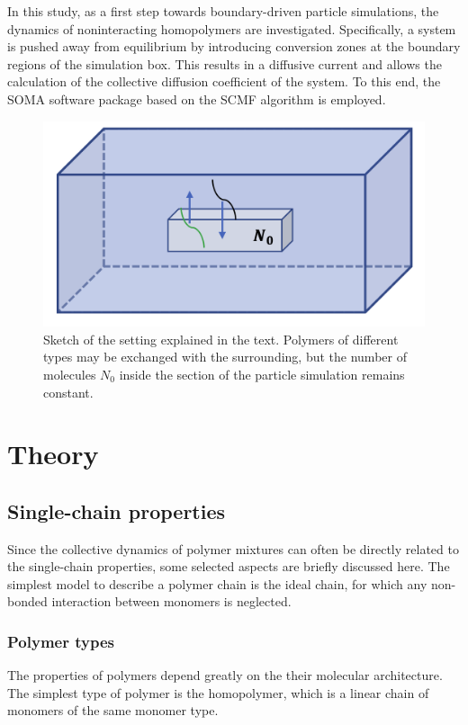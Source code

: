 \documentclass[bachelor,       %
               twoside,        %
               BCOR10mm,       %
               ngerman, english %
               ]{GAUBM}
\begin{document}
In this study, as a first step towards boundary-driven particle simulations, the dynamics of noninteracting homopolymers are investigated. Specifically, a system is pushed away from equilibrium by introducing conversion zones at the boundary regions of the simulation box. This results in a diffusive current and allows the calculation of the collective diffusion coefficient of the system. To this end, the \ac{SOMA} \cite{Schneider_soma} software package based on the \ac{SCMF} algorithm \cite{Daoulas06} is employed.
\begin{figure}[h]
  \centering
  \includegraphics[width=0.5\linewidth]{figures/continuum_section.png}
  \caption{Sketch of the setting explained in the text. Polymers of different types may be exchanged with the surrounding, but the number of molecules $N_0$ inside the section of the particle simulation remains constant.}
  \label{fig:continuum_section}
\end{figure}



\chapter{Theory}

\section{Single-chain properties}

Since the collective dynamics of polymer mixtures can often be directly related to the single-chain properties, some selected aspects are briefly discussed here. The simplest model to describe a polymer chain is the ideal chain, for which any non-bonded interaction between monomers is neglected.

\subsection{Polymer types}

The properties of polymers depend greatly on the their molecular architecture. The simplest type of polymer is the homopolymer, which is a linear chain of monomers of the same monomer type. 
\end{document}

